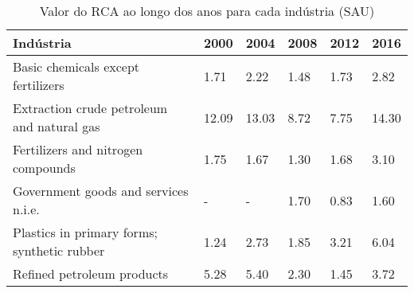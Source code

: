 \begin{table}
\centering
\caption{Valor do RCA ao longo dos anos para cada indústria (SAU)}
\label{tab:ex3-tempo-SAU}
\begin{tabular}{p{6cm}p{1.5cm}p{1.5cm}p{1.5cm}p{1.5cm}p{1.5cm}}
\toprule
                                  Indústria &  2000 &  2004 & 2008 & 2012 &  2016 \\
\midrule
         Basic chemicals except fertilizers &  1.71 &  2.22 & 1.48 & 1.73 &  2.82 \\
 Extraction crude petroleum and natural gas & 12.09 & 13.03 & 8.72 & 7.75 & 14.30 \\
         Fertilizers and nitrogen compounds &  1.75 &  1.67 & 1.30 & 1.68 &  3.10 \\
       Government goods and services n.i.e. &     - &     - & 1.70 & 0.83 &  1.60 \\
Plastics in primary forms; synthetic rubber &  1.24 &  2.73 & 1.85 & 3.21 &  6.04 \\
                 Refined petroleum products &  5.28 &  5.40 & 2.30 & 1.45 &  3.72 \\
\bottomrule
\end{tabular}
\end{table}
